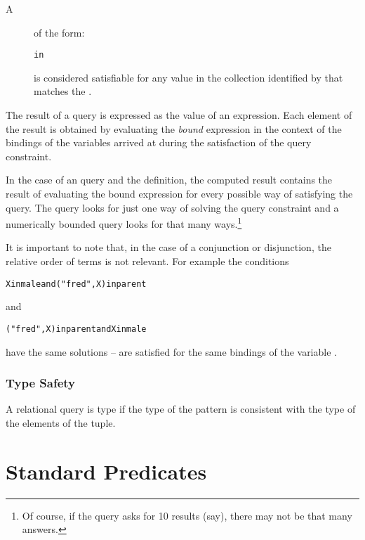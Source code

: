 \begin{description}
\item[A ] of the form:
\begin{alltt}
 in 
\end{alltt}
is considered satisfiable for any value in the collection identified by  that matches the . 
\end{description}


The result of a query is expressed as the value of an expression. Each element of the result is obtained by evaluating the \emph{bound} expression in the context of the bindings of the variables arrived at during the satisfaction of the query constraint.

In the case of an  query and the  definition, the computed result contains the result of evaluating the bound expression for every possible way of satisfying the query.  The  query looks for just one way of solving the query constraint and a numerically bounded query looks for that many ways.\footnote{Of course, if the query asks for 10 results (say), there may not be that many answers.}

\begin{aside}
It is important to note that, in the case of a conjunction or disjunction, the relative order of terms is not relevant. For example the conditions
\begin{alltt}
X in male and ("fred",X) in parent
\end{alltt}
and
\begin{alltt}
("fred",X) in parent and X in male
\end{alltt}
have the same solutions -- are satisfied for the same bindings of the variable .
\end{aside}

\subsubsection{Type Safety}
\label{querytypesatty}
A relational query is type if the type of the pattern is consistent with the type of the elements of the tuple.



\section{Standard Predicates}
\label{predicates}

